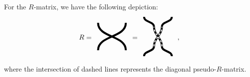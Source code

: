 \documentclass[10pt]{article}
\theoremstyle{definition}
\numberwithin{equation}{section}
\begin{document}
For the $R$-matrix, we have the following depiction:
\begin{equation}
	R=\begin{array}{c}
		\begin{tikzpicture}[scale=0.7]
			\draw[line width=1mm] (-1,-1) to[out=90,in=270] (1,1) (1,-1) to[out=90,in=270] (-1,1);
		\end{tikzpicture}
	\end{array} =\begin{array}{c}
	\begin{tikzpicture}
		\draw[line width=1mm] (-0.7,-1) to[out=90,in=270] (-0.2,-0.5) to[out=90,in=270] (0.2,0.5) to[out=90,in=270] (0.7,1) (0.7,-1) to[out=90,in=270] (0.2,-0.5) to[out=90,in=270] (-0.2,0.5) to[out=90,in=270] (-0.7,1);
		\draw[dashed, white, line width =0.5mm] (-0.2,-0.5) to[out=90,in=270] (0.2,0.5) (0.2,-0.5) to[out=90,in=270] (-0.2,0.5);
	\end{tikzpicture}
	\end{array}\,,
\end{equation}
where the intersection of dashed lines represents the diagonal pseudo-$R$-matrix.
\end{document}
